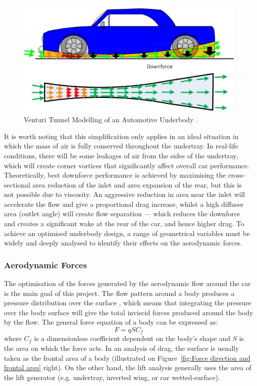 \begin{figure}[!ht]
    \centering
    \includegraphics[scale=0.7]{Figures/venturi_tunnel.jpg}
    \caption{Venturi Tunnel Modelling of an Automotive Underbody \cite{Anonymous2020RaceDesign}.}
    \label{fig:venturi_tunnel_car}
\end{figure}

\noindent It is worth noting that this simplification only applies in an ideal situation in which the mass of air is fully conserved throughout the undertray. In real-life conditions, there will be some leakages of air from the sides of the undertray, which will create corner vortices that significantly affect overall car performance. Theoretically, best downforce performance is achieved by maximising the cross-sectional area reduction of the inlet and area expansion of the rear, but this is not possible due to viscosity. An aggressive reduction in area near the inlet will accelerate the flow and give a proportional drag increase, whilst a high diffuser area (outlet angle) will create flow separation --- which reduces the downforce and creates a significant wake at the rear of the car, and hence higher drag. To achieve an optimised underbody design, a range of geometrical variables must be widely and deeply analysed to identify their effects on the aerodynamic forces.

\subsubsection{Aerodynamic Forces}
The optimisation of the forces generated by the aerodynamic flow around the car is the main goal of this project. The flow pattern around a body produces a pressure distribution over the surface \cite{Scibor-Rylski1984RoadAerodynamics}, which means that integrating the pressure over the body surface will give the total inviscid forces produced around the body by the flow. The general force equation of a body can be expressed as:
\begin{equation}
    F = qSC_f
\end{equation}
where $C_f$ is a dimensionless coefficient dependent on the body's shape \cite{Scibor-Rylski1984RoadAerodynamics} and $S$ is the area on which the force acts. In an analysis of drag, the surface is usually taken as the frontal area of a body (illustrated on Figure~\ref{fig:Force direction and frontal area} right). On the other hand, the lift analysis generally uses the area of the lift generator (e.g. undertray, inverted wing, or car wetted-surface).

